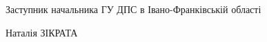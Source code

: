 	\vspace{20.8pt}
	
	\begin{minipage}{0.4\textwidth}
		Заступник начальника ГУ ДПС в Івано-Франківській області
	\end{minipage}
	\hspace{8ex} \hspace{1ex} \hspace{5ex} {\normalsize Наталія ЗІКРАТА }

	
	\medskip 
	
	\begin{flushleft}
		\hspace{5ex}{\footnotesize 	Вик. Олександр Фролов IP2194}
	\end{flushleft}  
	
	
	
	